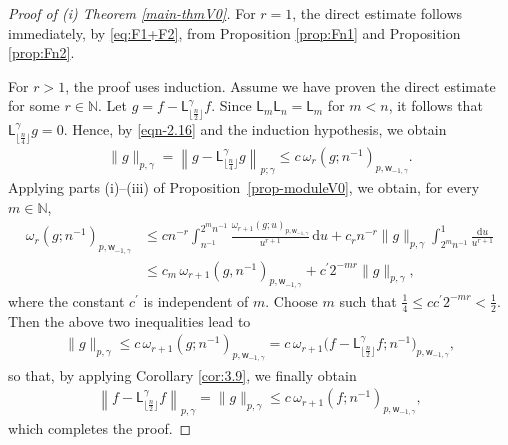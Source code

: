\documentclass{amsart}
\theoremstyle{remark}
\def\g{{\gamma}}
\def\o{{\omega}}
\def\NN{{\mathbb N}}
\def\sL{{\mathsf L}}
\def\sw{{\mathsf w}}
\def\g{{\gamma}}
\def\o{{\omega}}
\def\NN{{\mathbb N}}
\begin{document}
\begin{proof}[Proof of (i) Theorem \ref{main-thmV0}]
For $r=1$, the direct estimate follows immediately, by \eqref{eq:F1+F2}, from Proposition \ref{prop:Fn1} and 
Proposition \ref{prop:Fn2}. 

For $r>1$, the proof uses induction. Assume we have proven the direct estimate for some $r \in \NN$. 
Let $g = f - \sL_{\lfloor \frac n 2 \rfloor}^\g f$. Since $\sL_m \sL_n = \sL_m$ for $m < n$, it follows that
$\sL^\g_{\lfloor \frac n 4 \rfloor} g = 0$. Hence, by \eqref{eqn-2.16} and the induction hypothesis, we obtain 
\begin{align*}
	\|g\|_{p,\g} = \left \|g - \sL^\g_{\lfloor \frac n 4 \rfloor} g\right \|_{p;\g} \le c\, \o_r(g; n^{-1})_{p,\sw_{-1,\g}}. 
\end{align*}
Applying parts (i)--(iii) of Proposition~\ref{prop-moduleV0}, we obtain, for every \( m \in \mathbb{N} \),
\begin{align*}
  \omega_r(g; n^{-1})_{p,\sw_{-1,\g}} 
	& \le c n^{-r} \int_{n^{-1}}^{2^m n^{-1}} \frac{\omega_{r+1}(g; u)_{p,\sw_{-1,\g}}} {u^{r+1}}\, \mathrm{d} u
	+ c_r n^{-r}\|g\|_{p,\g} \int_{2^{m}n^{-1}}^1 \frac{\mathrm{d} u}{u^{r+1}}  \\
	&\le c_{m}\, \omega_{r+1}(g, n^{-1})_{p,\sw_{-1,\g}} + c^{\prime} 2^{-mr} \|g\|_{p,\g},
\end{align*} 
where the constant \( c^{\prime} \) is independent of \( m \).  
Choose $m$ such that \( \frac{1}{4} \le  c  c^{\prime} 2^{-mr} < \frac{1}{2} \). Then the above two inequalities 
lead to 
\begin{align*}
	\|g\|_{p,\g} \le c\,  \omega_{r+1}(g; n^{-1})_{p,\sw_{-1,\g}} = 
	    c\, \omega_{r+1}\Big( f - \sL_{\lfloor \frac n 2 \rfloor}^\g f; n^{-1}\Big)_{p,\sw_{-1,\g}}, 
\end{align*}
so that, by applying Corollary \ref{cor:3.9}, we finally obtain 
\begin{align*}
	\left\| f - \sL_{\lfloor \frac n 2 \rfloor}^\g f \right\|_{p,\g} = \|g\|_{p,\g} \le c\, \o_{r+1}(f; n^{-1})_{p,\sw_{-1,\g}},
\end{align*}
which completes the proof.
\end{proof}
\end{document}
